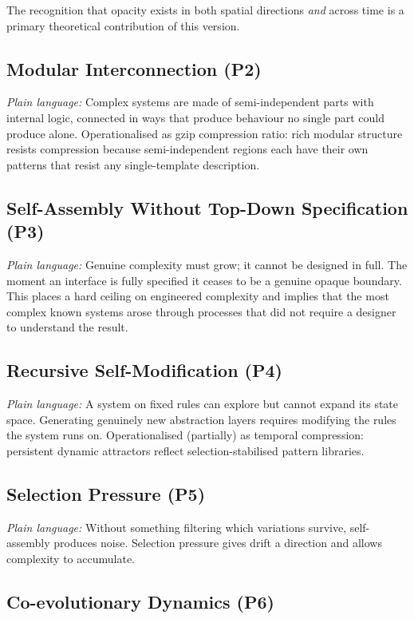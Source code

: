 \documentclass[12pt,a4paper]{article}
\begin{document}
The recognition that opacity exists in both spatial directions
\emph{and} across time is a primary theoretical contribution of this
version.

\subsection{Modular Interconnection (P2)}

\textit{Plain language:} Complex systems are made of semi-independent
parts with internal logic, connected in ways that produce behaviour no
single part could produce alone.
Operationalised as gzip compression ratio: rich modular structure
resists compression because semi-independent regions each have their
own patterns that resist any single-template description.

\subsection{Self-Assembly Without Top-Down Specification (P3)}

\textit{Plain language:} Genuine complexity must grow; it cannot be
designed in full.
The moment an interface is fully specified it ceases to be a genuine
opaque boundary.
This places a hard ceiling on engineered complexity and implies that
the most complex known systems arose through processes that did not
require a designer to understand the result.

\subsection{Recursive Self-Modification (P4)}

\textit{Plain language:} A system on fixed rules can explore but
cannot expand its state space.
Generating genuinely new abstraction layers requires modifying the
rules the system runs on.
Operationalised (partially) as temporal compression: persistent
dynamic attractors reflect selection-stabilised pattern libraries.

\subsection{Selection Pressure (P5)}

\textit{Plain language:} Without something filtering which variations
survive, self-assembly produces noise.
Selection pressure gives drift a direction and allows complexity to
accumulate.

\subsection{Co-evolutionary Dynamics (P6)}
\end{document}
